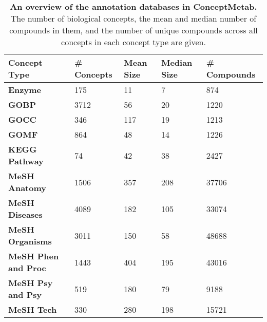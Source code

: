 \begin{table}[!ht]
\small
\centering
\begin{tabular}{l|llll}
\textbf{Concept Type}       & \textbf{\# Concepts} & \textbf{Mean Size} & \textbf{Median Size} & \textbf{\# Compounds} \\\hline
\textbf{Enzyme}             & 175                  & 11                 & 7                    & 874                   \\
\textbf{GOBP}               & 3712                 & 56                 & 20                   & 1220                  \\
\textbf{GOCC}               & 346                  & 117                & 19                   & 1213                  \\
\textbf{GOMF}               & 864                  & 48                 & 14                   & 1226                  \\
\textbf{KEGG Pathway}       & 74                   & 42                 & 38                   & 2427                  \\
\textbf{MeSH Anatomy}       & 1506                 & 357                & 208                  & 37706                 \\
\textbf{MeSH Diseases}      & 4089                 & 182                & 105                  & 33074                 \\
\textbf{MeSH Organisms}     & 3011                 & 150                & 58                   & 48688                 \\
\textbf{MeSH Phen and Proc} & 1443                 & 404                & 195                  & 43016                 \\
\textbf{MeSH Psy and Psy}   & 519                  & 180                & 79                   & 9188                  \\
\textbf{MeSH Tech}          & 330                  & 280                & 198                  & 15721
\end{tabular}
\normalsize
\caption[An overview of the annotation databases in ConceptMetab.]
{
\textbf{An overview of the annotation databases in ConceptMetab.}
The number of biological concepts, the mean and median number of compounds in them, and the number of unique compounds across all concepts in each concept type are given.
}
\label{chap3:table:1}

\end{table}

